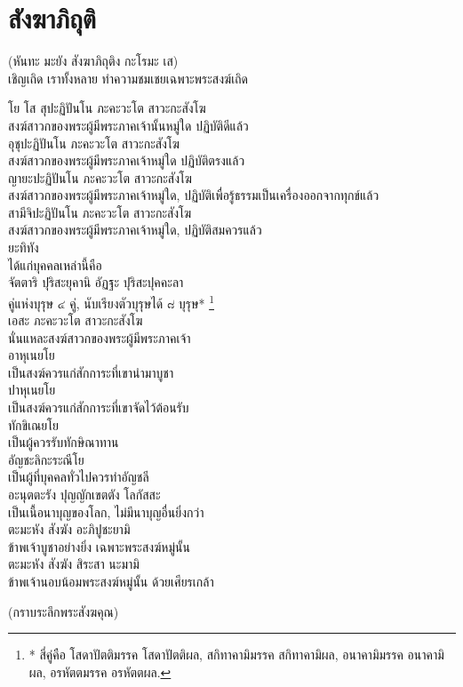 \documentclass{article}
\begin{document}
\section{สังฆาภิถุติ}
\begin{center}
(หันทะ มะยัง สังฆาภิถุติง กะโรมะ เส)\\
เชิญเถิด เราทั้งหลาย ทำความชมเชยเฉพาะพระสงฆ์เถิด
\end{center}
โย โส สุปะฏิปันโน ภะคะวะโต สาวะกะสังโฆ\\
\indent สงฆ์สาวกของพระผู้มีพระภาคเจ้านั้นหมู่ใด ปฏิบัติดีแล้ว\\
อุชุปะฏิปันโน ภะคะวะโต สาวะกะสังโฆ\\
\indent สงฆ์สาวกของพระผู้มีพระภาคเจ้าหมู่ใด ปฏิบัติตรงแล้ว\\
ญายะปะฏิปันโน ภะคะวะโต สาวะกะสังโฆ\\
\indent สงฆ์สาวกของพระผู้มีพระภาคเจ้าหมู่ใด, ปฏิบัติเพื่อรู้ธรรมเป็นเครื่องออกจากทุกข์แล้ว\\
สามีจิปะฏิปันโน ภะคะวะโต สาวะกะสังโฆ\\
\indent สงฆ์สาวกของพระผู้มีพระภาคเจ้าหมู่ใด, ปฏิบัติสมควรแล้ว\\
ยะทิทัง\\
\indent ได้แก่บุคคลเหล่านี้คือ\\
จัตตาริ ปุริสะยุคานิ อัฏฐะ ปุริสะปุคคะลา\\
\indent คู่แห่งบุรุษ ๔ คู่, นับเรียงตัวบุรุษได้ ๘ บุรุษ*
\footnote{* สี่คู่คือ โสดาปัตติมรรค โสดาปัตติผล, สกิทาคามิมรรค สกิทาคามิผล,
อนาคามิมรรค อนาคามิผล, อรหัตตมรรค อรหัตตผล.}\\
เอสะ ภะคะวะโต สาวะกะสังโฆ\\
\indent นั่นแหละสงฆ์สาวกของพระผู้มีพระภาคเจ้า\\
อาหุเนยโย\\
\indent เป็นสงฆ์ควรแก่สักการะที่เขานำมาบูชา\\
ปาหุเนยโย\\
\indent เป็นสงฆ์ควรแก่สักการะที่เขาจัดไว้ต้อนรับ\\
ทักขิเณยโย\\
\indent เป็นผู้ควรรับทักษิณาทาน\\
อัญชะลิกะระณีโย\\
\indent เป็นผู้ที่บุคคลทั่วไปควรทำอัญชลี\\
อะนุตตะรัง ปุญญักเขตตัง โลกัสสะ\\
\indent เป็นเนื้อนาบุญของโลก, ไม่มีนาบุญอื่นยิ่งกว่า\\
ตะมะหัง สังฆัง อะภิปูชะยามิ\\
\indent ข้าพเจ้าบูชาอย่างยิ่ง เฉพาะพระสงฆ์หมู่นั้น\\
ตะมะหัง สังฆัง สิระสา นะมามิ\\
\indent ข้าพเจ้านอบน้อมพระสงฆ์หมู่นั้น ด้วยเศียรเกล้า\\
\begin{center}
(กราบระลึกพระสังฆคุณ)
\end{center}
\pagebreak
\end{document}
